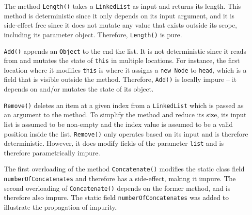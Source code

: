 \documentclass[a4paper,12pt]{article}
\begin{document}
The method \texttt{Length()} takes a \texttt{LinkedList} as input and returns its length. This method is deterministic since it only depends on its input argument, and it is side-effect free since it does not mutate any value that exists outside its scope, including its parameter object. Therefore, \texttt{Length()} is pure.

\texttt{Add()} appends an \texttt{Object} to the end the list. It is not deterministic since it reads from and mutates the state of \texttt{this} in multiple locations. For instance, the first location where it modifies \texttt{this} is where it assigns a \texttt{new Node} to \texttt{head}, which is a field that is visible outside the method. Therefore, \texttt{Add()} is locally impure -- it depends on and/or mutates the state of its object.

\texttt{Remove()} deletes an item at a given index from a \texttt{LinkedList} which is passed as an argument to the method. To simplify the method and reduce its size, its input list is assumed to be non-empty and the index value is assumed to be a valid position inside the list. \texttt{Remove()} only operates based on its input and is therefore deterministic. However, it does modify fields of the parameter \texttt{list} and is therefore parametrically impure.

The first overloading of the method \texttt{Concatenate()} modifies the static class field \texttt{numberOfConcatenates} and therefore has a side-effect, making it impure. The second overloading of \texttt{Concatenate()} depends on the former method, and is therefore also impure. The static field \texttt{numberOfConcatenates} was added to illustrate the propagation of impurity.
\end{document}
